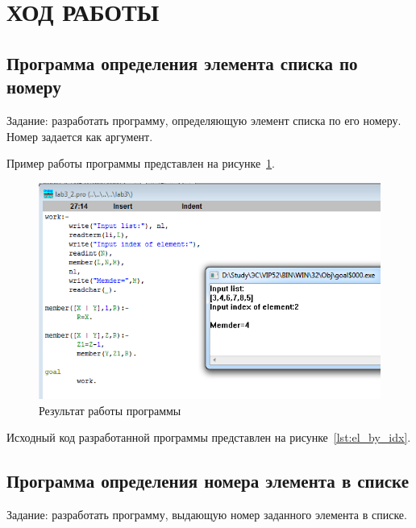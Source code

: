 \section{ХОД РАБОТЫ}

\subsection{Программа определения элемента списка по номеру}

Задание: разработать программу, определяющую элемент списка по его номеру.
Номер задается как аргумент.

Пример работы программы представлен на рисунке~\ref{fig:el_by_idx}.

\begin{figure}[h!]
  \centering
  \includegraphics[width=150mm]{img/el_by_idx}
  \caption{Результат работы программы}
  \label{fig:el_by_idx}
\end{figure}

Исходный код разработанной программы представлен на
рисунке~\ref{lst:el_by_idx}.

\pagebreak




\subsection{Программа определения номера элемента в списке}

Задание: разработать программу, выдающую номер заданного элемента в списке.

